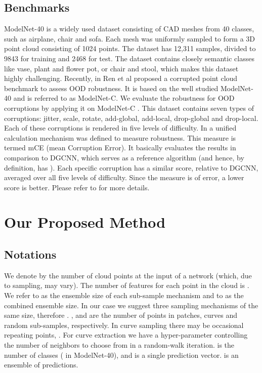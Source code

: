 \documentclass[10pt,twocolumn]{article}
\begin{document}
\subsection{Benchmarks}
\label{sec:benchmarks}
ModelNet-40 \cite{modelnet40} is a widely used dataset consisting of CAD meshes from 40 classes, such as airplane, chair and sofa. Each mesh was uniformly sampled to form a 3D point cloud consisting of 1024 points. The dataset has 12,311 samples, divided to 9843 for training and 2468 for test. The dataset contains closely semantic classes like vase, plant and flower pot, or chair and stool, which makes this dataset highly challenging.
Recently, in \cite{modelnetc} Ren et al proposed a corrupted point cloud benchmark to assess OOD robustness. It is based on the well studied ModelNet-40 and is referred to as ModelNet-C. 
We evaluate the robustness for OOD corruptions by applying it on ModelNet-C \cite{modelnetc}. This dataset contains seven types of corruptions: jitter, scale, rotate, add-global, add-local, drop-global and drop-local. Each of these corruptions is rendered in five levels of difficulty. In \cite{modelnetc} a unified calculation mechanism was defined to measure robustness. This measure is termed mCE (mean Corruption Error). It basically evaluates the results in comparison to DGCNN, which serves as a reference algorithm (and hence, by definition, has ). Each specific corruption has a similar score, relative to DGCNN, averaged over all five levels of difficulty. Since the measure is of error, a lower score is better. Please refer to 
\cite{modelnetc} for more details.







\section{Our Proposed Method}
\label{sec:method}

\subsection {Notations}
We denote by  the number of cloud points at the input of a network (which, due to sampling, may vary). The number of features for each point in the cloud is . We refer to  as the ensemble size of each sub-sample mechanism and to  as the combined ensemble size. In our case we suggest three sampling mechanisms of the same size, therefore . ,  and  are the number of points in patches, curves and random sub-samples, respectively. In curve sampling there may be occasional repeating points, .
For curve extraction we have a hyper-parameter  controlling the number of neighbors to choose from in a random-walk iteration.  is the number of classes ( in ModelNet-40), and  is a single prediction vector.  is an ensemble of predictions. 
\end{document}
